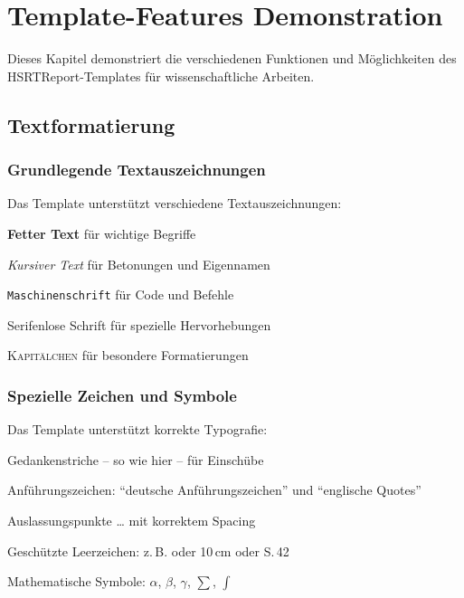 
\chapter{Template-Features Demonstration}
\label{chap:template_demo}

Dieses Kapitel demonstriert die verschiedenen Funktionen und Möglichkeiten des HSRTReport-Templates für wissenschaftliche Arbeiten.

\section{Textformatierung}
\label{sec:textformatierung_demo}

\subsection{Grundlegende Textauszeichnungen}
\label{subsec:textauszeichnungen}

Das Template unterstützt verschiedene Textauszeichnungen:
\begin{listenabsatz}
	\item \textbf{Fetter Text} für wichtige Begriffe
	\item \emph{Kursiver Text} für Betonungen und Eigennamen
	\item \texttt{Maschinenschrift} für Code und Befehle
	\item \textsf{Serifenlose Schrift} für spezielle Hervorhebungen
	\item \textsc{Kapitälchen} für besondere Formatierungen
\end{listenabsatz}

\subsection{Spezielle Zeichen und Symbole}
\label{subsec:spezielle_zeichen}

Das Template unterstützt korrekte Typografie:
\begin{listenabsatz}
	\item Gedankenstriche -- so wie hier -- für Einschübe
	\item Anführungszeichen: "`deutsche Anführungszeichen"' und ``englische Quotes''
	\item Auslassungspunkte \ldots{} mit korrektem Spacing
	\item Geschützte Leerzeichen: z.\,B. oder 10\,cm oder S.\,42
	\item Mathematische Symbole: $\alpha$, $\beta$, $\gamma$, $\sum$, $\int$
\end{listenabsatz}


